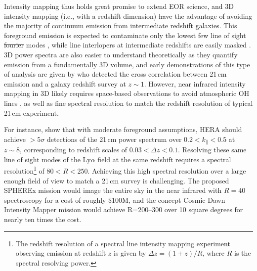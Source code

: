 \documentclass[numberedappendix]{emulateapj}
\providecommand{\DIFadd}[1]{{\protect\color{blue}\uwave{#1}}} %
\providecommand{\DIFdel}[1]{{\protect\color{red}\sout{#1}}}                      %
\providecommand{\DIFaddbegin}{} %
\providecommand{\DIFaddend}{} %
\providecommand{\DIFdelbegin}{} %
\providecommand{\DIFdelend}{} %
\begin{document}
Intensity mapping thus holds great promise to extend EOR science, and 3D intensity mapping (i.e., with a redshift dimension) \DIFdelbegin \DIFdel{have }\DIFdelend \DIFaddbegin \DIFadd{has }\DIFaddend the advantage of avoiding the majority of continuum emission from intermediate redshift galaxies. This foreground emission is expected to contaminate only the lowest few line of sight \DIFdelbegin \DIFdel{fourier }\DIFdelend \DIFaddbegin \DIFadd{Fourier }\DIFaddend modes \citep{gong17}, while line interlopers at intermediate redshifts are easily masked \citep{Gong2014,gong17,pullen14,Comaschi16}. 3D power spectra are also easier to understand theoretically as they quantify emission from a fundamentally 3D volume, and early demonstrations of this type of analysis are given by \citet{Chang2010,Masui2013} who detected the cross correlation between 21\,cm emission and a galaxy redshift survey at $z\sim1$. However, near infrared intensity mapping in 3D likely requires space-based observations to avoid atmospheric OH lines \citep[e.g.][]{sullivan12}, as well as fine spectral resolution to match the redshift resolution of typical 21\,cm experiment. 

For instance, \citet{PoberNextGen} show that with moderate foreground assumptions, HERA should achieve $>5\sigma$ detections of the 21\,cm power spectrum 	over $0.2<k_\parallel<0.5$ at $z\sim8$, corresponding to redshift scales of $0.03<\Delta z<0.1$. Resolving these same line of sight modes of the Ly$\alpha$ field at the same redshift requires a spectral resolution\footnote{The redshift resolution of a spectral line intensity mapping experiment observing emission at redshift $z$ is given by $\Delta z=(1+z)/R$, where $R$ is the spectral resolving power.} of $80<R<250$. Achieving this high spectral resolution over a large enough field of view to match a 21\,cm survey is challenging. The proposed SPHEREx mission \citep{ScienceWithSpherex,SpherexWhitePaper} would image the entire sky in the near infrared with $R=40$ spectroscopy for a cost of roughly \$100M, and the concept Cosmic Dawn Intensity Mapper \citep{cooray16} mission would achieve R=200--300 over 10 square degrees for nearly ten times the cost.
\end{document}

